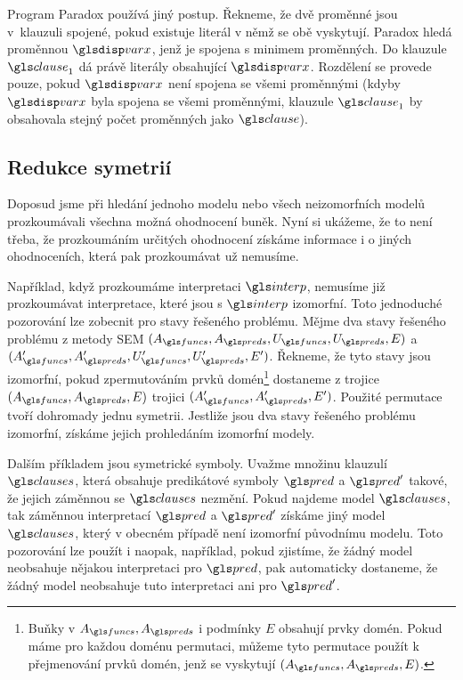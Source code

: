 Program Paradox \cite{claessen03paradox} používá jiný postup.
Řekneme, že dvě proměnné jsou v~klauzuli spojené, pokud
existuje literál v němž se obě vyskytují.
Paradox hledá proměnnou $\var$, jenž je spojena s minimem proměnných.
Do klauzule $\clause_1$ dá právě literály obsahující $\var$.
Rozdělení se provede pouze, pokud $\var$ není spojena se všemi proměnnými
(kdyby $\var$ byla spojena se všemi proměnnými, klauzule $\clause_1$
by obsahovala stejný počet proměnných jako $\clause$).

\subsection{Redukce symetrií}

Doposud jsme při hledání jednoho modelu nebo všech neizomorfních modelů
prozkoumávali všechna možná ohodnocení buněk. Nyní si ukážeme,
že to není třeba, že prozkoumáním určitých ohodnocení získáme
informace i o jiných ohodnoceních, která pak prozkoumávat už nemusíme.

Například, když prozkoumáme interpretaci $\interp$,
nemusíme již prozkoumávat interpretace, které jsou s $\interp$ izomorfní.
Toto jednoduché pozorování lze zobecnit pro stavy řešeného
problému.
Mějme dva stavy řešeného problému z metody SEM
$(A_\funcs, A_\preds, U_\funcs, U_\preds, E)$
a $(A_\funcs', A_\preds', U_\funcs', U_\preds', E')$.
Řekneme, že tyto stavy jsou izomorfní,
pokud zpermutováním prvků domén\footnote{Buňky v $A_\funcs, A_\preds$
i podmínky $E$ obsahují prvky domén.
Pokud máme pro každou doménu permutaci,
můžeme tyto permutace použít k přejmenování prvků domén,
jenž se vyskytují $(A_\funcs, A_\preds, E)$.}
dostaneme z trojice $(A_\funcs, A_\preds, E)$
trojici $(A_\funcs', A_\preds', E')$.
Použité permutace tvoří dohromady jednu symetrii.
Jestliže jsou dva stavy řešeného problému izomorfní,
získáme jejich prohledáním izomorfní modely.


Dalším příkladem jsou symetrické symboly. Uvažme
množinu klauzulí $\clauses$, která obsahuje
predikátové symboly $\pred$ a $\pred'$ takové,
že jejich záměnnou se $\clauses$ nezmění.
Pokud najdeme model $\clauses$, tak záměnnou interpretací
$\pred$ a $\pred'$ získáme jiný model $\clauses$, který
v obecném případě není izomorfní původnímu modelu.
Toto pozorování lze použít i naopak, například,
pokud zjistíme, že žádný model neobsahuje nějakou interpretaci pro $\pred$,
pak automaticky dostaneme, že žádný model neobsahuje tuto interpretaci
ani pro $\pred'$.

